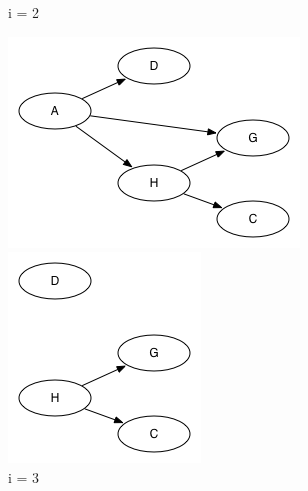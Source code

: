 \documentclass[11pt,a4paper]{article}
\begin{document}
\begin{figure}[h]
\begin{minipage}[t]{4 cm}
		\caption{i = 2}
  	\end{minipage}
  	\begin{minipage}[t]{4 cm}
		\includegraphics[width=\linewidth]{101c3}
		\caption{i = 3}
  	\end{minipage}
  	\begin{minipage}[t]{4 cm}
		\includegraphics[width=\linewidth]{101c4}

\end{minipage}
\end{figure}
\end{document}
